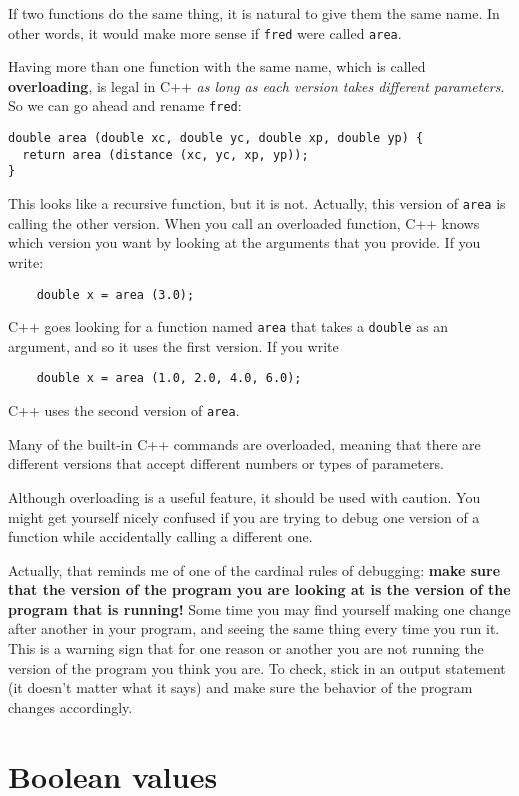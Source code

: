 If two functions do the same thing, it is natural to give them
the same name.  In other words, it would make more sense if
{\tt fred} were called {\tt area}.

Having more than one function with the same name, which is called {\bf
overloading}, is legal in C++ {\em as long as each version takes
different parameters}.  So we can go ahead and rename {\tt fred}:

\begin{verbatim}
double area (double xc, double yc, double xp, double yp) {
  return area (distance (xc, yc, xp, yp));
} 
\end{verbatim}
%
This looks like a recursive function, but it is not.  Actually,
this version of {\tt area} is calling the other version.
When you call an overloaded function, C++ knows which version you
want by looking at the arguments that you provide.  If you write:

\begin{verbatim}
    double x = area (3.0);
\end{verbatim}
%
C++ goes looking for a function named {\tt area} that
takes a {\tt double} as an argument, and so it uses the
first version.  If you write

\begin{verbatim}
    double x = area (1.0, 2.0, 4.0, 6.0);
\end{verbatim}
%
C++ uses the second version of {\tt area}.  

Many of the built-in C++ commands are overloaded, meaning that there
are different versions that accept different numbers or types of
parameters.

Although overloading is a useful feature, it should be used with
caution.  You might get yourself nicely confused if you are trying to
debug one version of a function while accidentally calling a different
one.

Actually, that reminds me of one of the cardinal rules of debugging:
{\bf make sure that the version of the program you are looking at is
the version of the program that is running!}  Some time you may find
yourself making one change after another in your program, and seeing
the same thing every time you run it.  This is a warning sign that for
one reason or another you are not running the version of the program
you think you are.  To check, stick in an output statement (it
doesn't matter what it says) and make sure the behavior of the
program changes accordingly.

\section{Boolean values}

